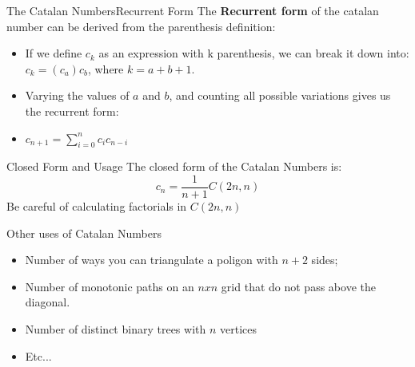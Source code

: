 \begin{frame}{The Catalan Numbers}{Recurrent Form}
  The {\bf Recurrent form} of the catalan number can be derived from the parenthesis definition:\bigskip

  \begin{itemize}
    \item If we define $c_k$ as an expression with k parenthesis, we can break it down into: $c_k = (c_a)c_b$, where $k = a + b + 1$. \medskip

    \item Varying the values of $a$ and $b$, and counting all possible variations gives us the recurrent form:\medskip

    \item $c_{n+1} = \sum_{i=0}^n c_ic_{n-i}$
  \end{itemize}
\end{frame}


\begin{frame}{Closed Form and Usage}
  The closed form of the Catalan Numbers is:
  \begin{equation*}
    c_n = \frac{1}{n+1}C(2n,n)
  \end{equation*}
  Be careful of calculating factorials in $C(2n,n)$\bigskip

  \begin{block}{Other uses of Catalan Numbers}
    \begin{itemize}
    \item Number of ways you can triangulate a poligon with $n+2$ sides;
    \item Number of monotonic paths on an $nxn$ grid that do not pass above
      the diagonal.
    \item Number of distinct binary trees with $n$ vertices
    \item Etc...
    \end{itemize}
  \end{block}
\end{frame}

